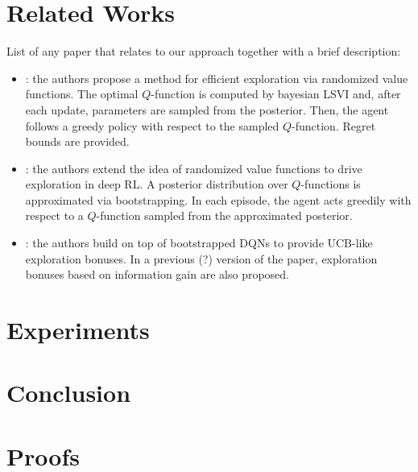 \documentclass{article}
\begin{document}
\section{Related Works}

List of any paper that relates to our approach together with a brief description:
\begin{itemize}
\item \cite{osband2014generalization}: the authors propose a method for efficient exploration via randomized value functions. The optimal $Q$-function is computed by bayesian LSVI and, after each update, parameters are sampled from the posterior. Then, the agent follows a greedy policy with respect to the sampled $Q$-function. Regret bounds are provided.
\item \cite{osband2016deep}: the authors extend the idea of randomized value functions to drive exploration in deep RL. A posterior distribution over $Q$-functions is approximated via bootstrapping. In each episode, the agent acts greedily with respect to a $Q$-function sampled from the approximated posterior.
\item \cite{chen2017ucb}: the authors build on top of bootstrapped DQNs to provide UCB-like exploration bonuses. In a previous (?) version of the paper, exploration bonuses based on information gain are also proposed.
\end{itemize}

\section{Experiments}

\section{Conclusion}

{\small 


}
\newpage
\appendix

\section{Proofs}
\end{document}
